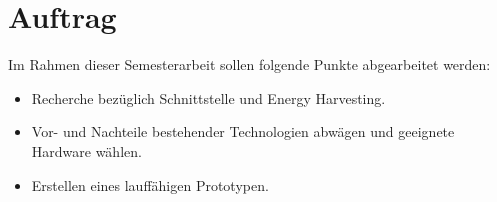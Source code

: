 \section{Auftrag}
\label{sec:generalProvision}

Im Rahmen dieser Semesterarbeit sollen folgende Punkte abgearbeitet werden:
\begin{itemize}
	\item Recherche bezüglich Schnittstelle und Energy Harvesting.	
	\item Vor- und Nachteile bestehender Technologien abwägen und geeignete Hardware wählen.	
	\item Erstellen eines lauffähigen Prototypen.
\end{itemize}
